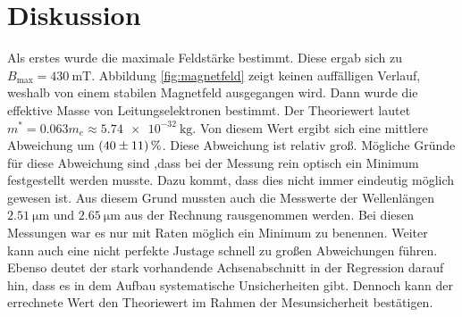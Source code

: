\chapter{Diskussion}
\label{cha:Diskussion}
Als erstes wurde die maximale Feldstärke bestimmt. Diese ergab sich zu $B_\mathrm{max} = \qty{430}{\milli\tesla}$. Abbildung \ref{fig:magnetfeld} zeigt keinen auffälligen Verlauf,
weshalb von einem stabilen Magnetfeld ausgegangen wird. 
Dann wurde die effektive Masse von Leitungselektronen bestimmt. Der Theoriewert lautet $m^* = \num{0.063}m_e \approx \qty{5.74e-32}{\kilo\gram}$. Von diesem Wert ergibt sich eine 
mittlere Abweichung um $\qty{40+-11}{\percent}$. Diese Abweichung ist relativ groß. Mögliche Gründe für diese Abweichung sind ,dass bei der Messung rein optisch ein Minimum 
festgestellt werden musste. Dazu kommt, dass dies nicht immer eindeutig möglich gewesen ist. Aus diesem Grund mussten auch die Messwerte der Wellenlängen $\qty{2,51}{\micro\metre}$
und  $\qty{2,65}{\micro\metre}$ aus der Rechnung rausgenommen werden. Bei diesen Messungen war es nur mit Raten möglich ein Minimum zu benennen. Weiter kann auch eine nicht perfekte 
Justage schnell zu großen Abweichungen führen. Ebenso deutet der stark vorhandende Achsenabschnitt in der Regression darauf hin, dass es in dem Aufbau systematische Unsicherheiten 
gibt. Dennoch kann der errechnete Wert den Theoriewert im Rahmen der Mesunsicherheit bestätigen.